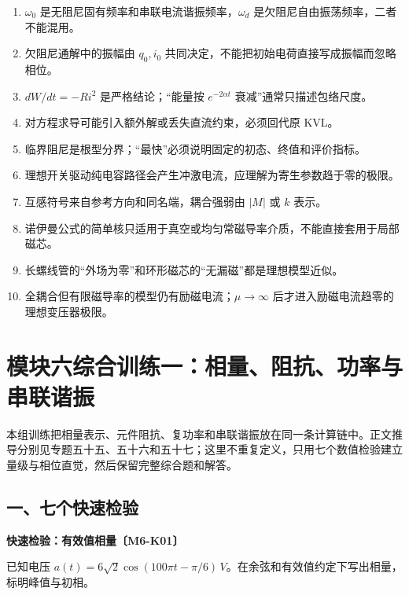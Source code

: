 \begin{enumerate}
\def\labelenumi{\arabic{enumi}.}
\tightlist
\item
  \(\omega_0\) 是无阻尼固有频率和串联电流谐振频率，\(\omega_d\)
  是欠阻尼自由振荡频率，二者不能混用。
\item
  欠阻尼通解中的振幅由 \(q_0,i_0\)
  共同决定，不能把初始电荷直接写成振幅而忽略相位。
\item
  \(dW/dt=-Ri^2\) 是严格结论；``能量按 \(e^{-2\alpha t}\)
  衰减''通常只描述包络尺度。
\item
  对方程求导可能引入额外解或丢失直流约束，必须回代原 KVL。
\item
  临界阻尼是根型分界；``最快''必须说明固定的初态、终值和评价指标。
\item
  理想开关驱动纯电容路径会产生冲激电流，应理解为寄生参数趋于零的极限。
\item
  互感符号来自参考方向和同名端，耦合强弱由 \(|M|\) 或 \(k\) 表示。
\item
  诺伊曼公式的简单核只适用于真空或均匀常磁导率介质，不能直接套用于局部磁芯。
\item
  长螺线管的``外场为零''和环形磁芯的``无漏磁''都是理想模型近似。
\item
  全耦合但有限磁导率的模型仍有励磁电流；\(\mu\to\infty\)
  后才进入励磁电流趋零的理想变压器极限。
\end{enumerate}

\section{模块六综合训练一：相量、阻抗、功率与串联谐振}\label{m6:ux6a21ux5757ux516dux7efcux5408ux8badux7ec3ux4e00ux76f8ux91cfux963bux6297ux529fux7387ux4e0eux4e32ux8054ux8c10ux632f}

本组训练把相量表示、元件阻抗、复功率和串联谐振放在同一条计算链中。正文推导分别见专题五十五、五十六和五十七；这里不重复定义，只用七个数值检验建立量级与相位直觉，然后保留完整综合题和解答。

\subsection{一、七个快速检验}\label{m6:ux4e00ux4e03ux4e2aux5febux901fux68c0ux9a8c}

\par{}
\noindent\begin{minipage}{\linewidth}

\textbf{快速检验：有效值相量〔M6-K01〕}

已知电压
\(a(t)=6\sqrt2\cos(100\pi t-\pi/6)\,V\)。在余弦和有效值约定下写出相量，标明峰值与初相。

\end{minipage}\par


